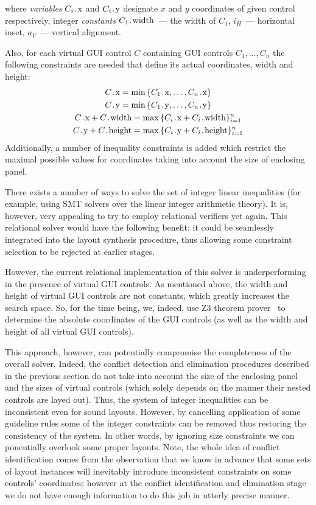 \noindent where \emph{variables} $C_i\prg{.x}$ and $C_i\prg{.y}$ designate $x$ and $y$ coordinates of given control respectively, integer
\emph{constants} $C_1\prg{.width}$~--- the width of $C_1$, $i_H$~--- horizontal inset, $a_V$~--- vertical alignment.

Also, for each virtual GUI control $C$ containing GUI controls $C_1, \ldots, C_n$ the following constraints are needed that define
its actual coordinates, width and height:
  \begin{gather*}
    C\prg{.x} = \min\,\{C_1\prg{.x}, \ldots, C_n\prg{.x}\}\\
    C\prg{.y} = \min\,\{C_1\prg{.y}, \ldots, C_n\prg{.y}\}\\
    C\prg{.x} + C\prg{.width} = \max\,\{C_i\prg{.x} + C_i\prg{.width}\}_{i=1}^n\\
    C\prg{.y} + C\prg{.height} = \max\,\{C_i\prg{.y} + C_i\prg{.height}\}_{i=1}^n\\
  \end{gather*}
Additionally, a number of inequality constraints is added which restrict the maximal possible values for
coordinates taking into account the size of enclosing panel.

There exists a number of ways to solve the set of integer linear inequalities (for example, using SMT solvers over the linear
integer arithmetic theory). It is, however, very appealing to try to employ relational verifiers yet again.
This relational solver would have the following benefit: it could be seamlessly integrated into the layout synthesis procedure, thus allowing some
constraint selection to be rejected at earlier stages.

However, the current relational implementation of this solver is underperforming in the presence of virtual GUI controls.
As mentioned above, the width and height of virtual GUI controls are not constants, which greatly increases the
search space. So, for the time being, we, indeed, use \textsc{Z3} theorem prover~\cite{Zthree} to determine the
absolute coordinates of the GUI controls (as well as the width and height of all virtual GUI controls).

This approach, however, can potentially compromise the completeness of the overall solver. Indeed, the conflict
detection and elimination procedures described in the previous section do not take into account the size of the
enclosing panel and the sizes of virtual controls (which solely depends on the manner their nested controls are
layed out). Thus, the system of integer inequalities can be inconsistent even for sound layouts. However,
by cancelling application of some guideline rules some of the integer constraints can be removed thus restoring
the consistency of the system. In other words, by ignoring size constraints we can ponentially overlook some
proper layouts. Note, the whole idea of conflict identification comes from the observation that we know
in advance that some sets of layout instances will inevitably introduce inconsistent constraints on
some controls' coordinates; however at the conflict identification and elimination stage we do not have
enough information to do this job in utterly precise manner.

